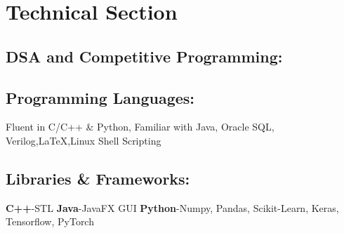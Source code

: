 \documentclass{article}
\begin{document}




\section*{Technical Section}

\subsection*{DSA and Competitive Programming:}

\subsection*{Programming Languages:}
Fluent in C/C++ \& Python, Familiar with Java, Oracle SQL, Verilog,{\LaTeX},Linux Shell Scripting

\subsection*{Libraries \& Frameworks:}
\textbf{C++}-STL
\textbf{Java}-JavaFX GUI
\textbf{Python}-Numpy, Pandas, Scikit-Learn, Keras, Tensorflow, PyTorch
\end{document}
